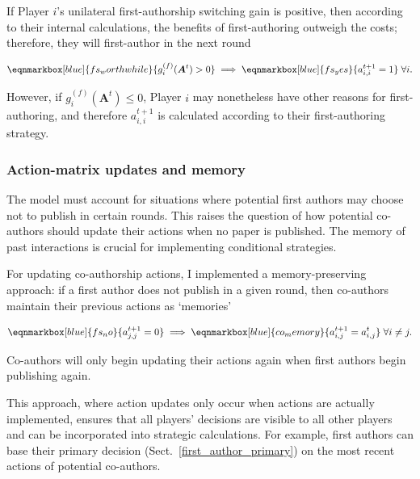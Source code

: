 \documentclass[12pt]{article}
\begin{document}
If Player $i$'s unilateral first-authorship switching gain is positive,
then according to their internal calculations,
the benefits of first-authoring outweigh the costs;
therefore,
they will first-author in the next round

\vspace{3em}
\begin{equation}
    \eqnmarkbox[blue]{fs_worthwhile}{g_i^{(f)}(\boldsymbol{A}^{t}) > 0} 
    \implies \eqnmarkbox[blue]{fs_yes}{a_{i, i}^{t+1} = 1} \; \forall i.
\end{equation}

However, if $g_i^{(f)}(\boldsymbol{A}^{t}) \leq 0$, 
Player $i$ may nonetheless have other reasons for first-authoring, 
and therefore $a_{i, i}^{t+1}$ is calculated according to their first-authoring strategy.

\subsubsection{Action-matrix updates and memory}

The model must account for situations where 
potential first authors may choose not to publish in certain rounds. 
This raises the question of how potential co-authors should update their actions 
when no paper is published.
The memory of past interactions is crucial for implementing conditional strategies.

For updating co-authorship actions, 
I implemented a memory-preserving approach:
if a first author does not publish in a given round,
then co-authors maintain their previous actions as `memories'

\vspace{1em}
\begin{equation}
    \eqnmarkbox[blue]{fs_no}{a_{j,j}^{t+1} = 0} \implies \eqnmarkbox[blue]{co_memory}{a_{i,j}^{t+1} = a_{i,j}^{t}} \; \forall i \neq j.
    \label{eq:coauthor_memory}
\end{equation}

Co-authors will only begin updating their actions again 
when first authors begin publishing again.

This approach, 
where action updates only occur
when actions are actually implemented,
ensures that all players' decisions are visible to all other players 
and can be incorporated into strategic calculations.
For example,
first authors can base their primary decision 
(Sect.~\ref{first_author_primary})
on the most recent actions of potential co-authors.
\end{document}
